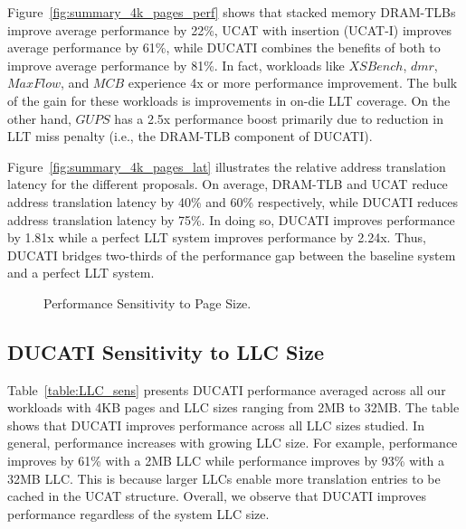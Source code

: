 Figure~\ref{fig:summary_4k_pages_perf} shows that stacked memory
DRAM-TLBs improve average performance by 22\%, UCAT with insertion
(UCAT-I) improves average performance by 61\%, while DUCATI combines
the benefits of both to improve average performance by 81\%. In fact,
workloads like $XSBench$, $dmr$, $MaxFlow$, and $MCB$ experience 4x or
more performance improvement. The bulk of the gain for these workloads
is improvements in on-die LLT coverage. On the other hand, $GUPS$ has
a 2.5x performance boost primarily due to reduction in LLT miss
penalty (i.e., the DRAM-TLB component of DUCATI). %

Figure~\ref{fig:summary_4k_pages_lat} illustrates the relative address
translation latency for the different proposals. On average, DRAM-TLB
and UCAT reduce address translation latency by 40\% and 60\%
respectively, while DUCATI reduces address translation latency by
75\%. In doing so, DUCATI improves performance by 1.81x while a
perfect LLT system improves performance by 2.24x. Thus, DUCATI bridges
two-thirds of the performance gap between the baseline system and a
perfect LLT system.

\begin{figure}[b] 
\vspace{0.2 in} \centering
\centerline{}

\caption{\small Performance Sensitivity to Page Size. \normalsize}

\label{fig:summary_pagesize} 
\vspace{-0. in}
\end{figure}



\subsection{DUCATI Sensitivity to LLC Size}

\noindent Table~\ref{table:LLC_sens} presents DUCATI performance
averaged across all our workloads with 4KB pages and LLC sizes ranging
from 2MB to 32MB. The table shows that DUCATI improves performance
across all LLC sizes studied. In general, performance increases with
growing LLC size. For example, performance improves by 61\% with a 2MB
LLC while performance improves by 93\% with a 32MB LLC. This is
because larger LLCs enable more translation entries to be cached in
the UCAT structure. Overall, we observe that DUCATI improves
performance regardless of the system LLC size.

